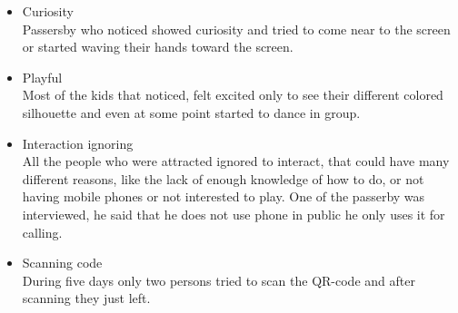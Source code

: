 \begin{enumerate}
\begin{itemize}
\item Curiosity \\
Passersby who noticed showed curiosity and tried to come near to the screen or started waving their hands toward the screen.
 

\item Playful   \\
Most of the kids that noticed, felt excited only to see their different colored silhouette and even at some point started to dance in group. 


\item Interaction ignoring \\
All the people who were attracted ignored to interact, that could have many different reasons, like the lack of enough knowledge of how to do, or not having mobile phones or not interested to play. One of the passerby was interviewed, he said that he does not use phone in public he only uses it for calling. 

\item Scanning code \\ 
During five days only two persons tried to scan the QR-code and after scanning they just left.

\end{itemize}

\end{enumerate}


